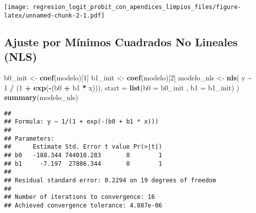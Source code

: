 \documentclass[
]{article}
\newenvironment{Shaded}{\begin{snugshade}}{\end{snugshade}}
\newcommand{\AttributeTok}[1]{\textcolor[rgb]{0.13,0.29,0.53}{#1}}
\newcommand{\DecValTok}[1]{\textcolor[rgb]{0.00,0.00,0.81}{#1}}
\newcommand{\FunctionTok}[1]{\textcolor[rgb]{0.13,0.29,0.53}{\textbf{#1}}}
\newcommand{\NormalTok}[1]{#1}
\newcommand{\OtherTok}[1]{\textcolor[rgb]{0.56,0.35,0.01}{#1}}
\newcommand{\SpecialCharTok}[1]{\textcolor[rgb]{0.81,0.36,0.00}{\textbf{#1}}}
\begin{document}
\texttt{[image: regresion\_logit\_probit\_con\_apendices\_limpios\_files/figure-latex/unnamed-chunk-2-1.pdf]}

\subsection{Ajuste por Mínimos Cuadrados No Lineales
(NLS)}\label{ajuste-por-muxednimos-cuadrados-no-lineales-nls}

\begin{Shaded}
\begin{Highlighting}[]
\NormalTok{b0\_init }\OtherTok{\textless{}{-}} \FunctionTok{coef}\NormalTok{(modelo)[}\DecValTok{1}\NormalTok{]}
\NormalTok{b1\_init }\OtherTok{\textless{}{-}} \FunctionTok{coef}\NormalTok{(modelo)[}\DecValTok{2}\NormalTok{]}
\NormalTok{modelo\_nls }\OtherTok{\textless{}{-}} \FunctionTok{nls}\NormalTok{(}
\NormalTok{  y }\SpecialCharTok{\textasciitilde{}} \DecValTok{1} \SpecialCharTok{/}\NormalTok{ (}\DecValTok{1} \SpecialCharTok{+} \FunctionTok{exp}\NormalTok{(}\SpecialCharTok{{-}}\NormalTok{(b0 }\SpecialCharTok{+}\NormalTok{ b1 }\SpecialCharTok{*}\NormalTok{ x))),}
  \AttributeTok{start =} \FunctionTok{list}\NormalTok{(}\AttributeTok{b0 =}\NormalTok{ b0\_init , }\AttributeTok{b1 =}\NormalTok{ b1\_init)}
\NormalTok{)}
\FunctionTok{summary}\NormalTok{(modelo\_nls)}
\end{Highlighting}
\end{Shaded}

\begin{verbatim}
## 
## Formula: y ~ 1/(1 + exp(-(b0 + b1 * x)))
## 
## Parameters:
##      Estimate Std. Error t value Pr(>|t|)
## b0   -188.344 744010.283       0        1
## b1     -7.197  27886.344       0        1
## 
## Residual standard error: 0.2294 on 19 degrees of freedom
## 
## Number of iterations to convergence: 16 
## Achieved convergence tolerance: 4.887e-06
\end{verbatim}
\end{document}
